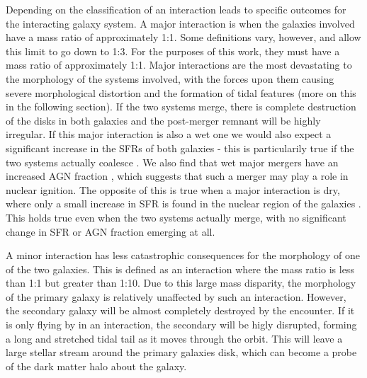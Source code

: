 Depending on the classification of an interaction leads to specific outcomes for the interacting galaxy system. A major interaction is when the galaxies involved have a mass ratio of approximately 1:1. Some definitions vary, however, and allow this limit to go down to 1:3. For the purposes of this work, they must have a mass ratio of approximately 1:1. Major interactions are the most devastating to the morphology of the systems involved, with the forces upon them causing severe morphological distortion and the formation of tidal features (more on this in the following section). If the two systems merge, there is complete destruction of the disks in both galaxies and the post-merger remnant will be highly irregular. If this major interaction is also a wet one we would also expect a significant increase in the SFRs of both galaxies \citep{Increases in SFR in wet interactions} - this is particularily true if the two systems actually coalesce \citep{Papers on increases in SFR in coalesced mergers}. We also find that wet major mergers have an increased AGN fraction \citep{Paper on wet major mergers and AGN}, which suggests that such a merger may play a role in nuclear ignition. The opposite of this is true when a major interaction is dry, where only a small increase in SFR is found in the nuclear region of the galaxies \citep{Papers on dry mergers leading to increased SFR in the nuclear region}. This holds true even when the two systems actually merge, with no significant change in SFR or AGN fraction emerging at all.


A minor interaction has less catastrophic consequences for the morphology of one of the two galaxies. This is defined as an interaction where the mass ratio is less than 1:1 but greater than 1:10. Due to this large mass disparity, the morphology of the primary galaxy is relatively unaffected by such an interaction. However, the secondary galaxy will be almost completely destroyed by the encounter. If it is only flying by in an interaction, the secondary will be higly disrupted, forming a long and stretched tidal tail as it moves through the orbit. This will leave a large stellar stream around the primary galaxies disk, which can become a probe of the dark matter halo about the galaxy.

